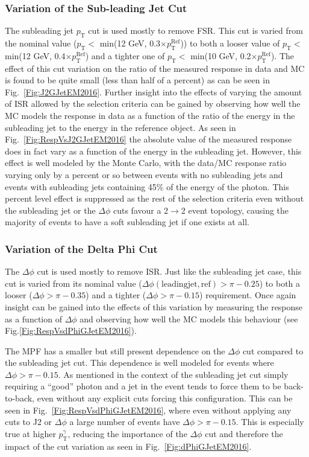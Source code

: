\subsubsection{Variation of the Sub-leading Jet Cut}
The subleading jet $p_{\mathrm T}$ cut is used mostly to remove FSR.
This cut is varied from the nominal value ($p_{\mathrm T}<$ min(12 GeV, 0.3$\times p_{\mathrm T}^{\mathrm {Ref}}$)) to both a looser value of $p_{\mathrm T}<$ min(12 GeV, 0.4$\times p_{\mathrm T}^{\mathrm {Ref}}$) and a tighter one of $p_{\mathrm T}<$ min(10 GeV, 0.2$\times p_{\mathrm T}^{\mathrm {Ref}}$).
The effect of this cut variation on the ratio of the measured response in data and MC is found to be quite small (less than half of a percent) as can be seen in Fig.~\ref{Fig:J2GJetEM2016}.
Further insight into the effects of varying the amount of ISR allowed by the selection criteria can be gained by observing how well the MC models the response in data as a function 
of the ratio of the energy in the subleading jet to the energy in the reference object.
As seen in Fig.~\ref{Fig:RespVsJ2GJetEM2016} the absolute value of the measured response does in fact vary as a function of the energy in the subleading jet.
However, this effect is well modeled by the Monte Carlo, with the data/MC response ratio varying only by a percent or so between events with no subleading jets and events with subleading jets containing 45\% of the energy of the photon.
This percent level effect is suppressed as the rest of the selection criteria even without the subleading jet or the $\Delta\phi$ cuts favour a 2$\rightarrow$2 event topology, causing the majority of events to have a soft subleading jet if one exists at all.


\subsubsection{Variation of the Delta Phi Cut}
The $\Delta\phi$ cut is used mostly to remove ISR.  
Just like the subleading jet case, this cut is varied from its nominal value ($\Delta \phi \left({\mathrm {leading jet, ref}}\right)>\pi-0.25$) to both a looser ($\Delta\phi>\pi-0.35$) and a tighter ($\Delta\phi>\pi-0.15$) requirement.
Once again insight can be gained into the effects of this variation by measuring the response as a function of $\Delta\phi$ and observing how well the MC models this behaviour (see Fig.\ref{Fig:RespVsdPhiGJetEM2016}).  

The MPF has a smaller but still present dependence on the $\Delta\phi$ cut compared to the subleading jet cut.  
This dependence is well modeled for events where $\Delta\phi>\pi-0.15$.  
As mentioned in the context of the subleading jet cut simply requiring a ``good'' photon and a jet in the event tends to force them to be back-to-back, even without any explicit cuts forcing this configuration.  
This can be seen in Fig.~\ref{Fig:RespVsdPhiGJetEM2016}, where even without applying any cuts to J2 or $\Delta\phi$ a large number of events have $\Delta\phi>\pi-0.15$.  
This is especially true at higher $p_{\mathrm T}^{\gamma}$, reducing the importance of the $\Delta\phi$ cut and therefore the impact of the cut variation as seen in Fig.~\ref{Fig:dPhiGJetEM2016}.  

